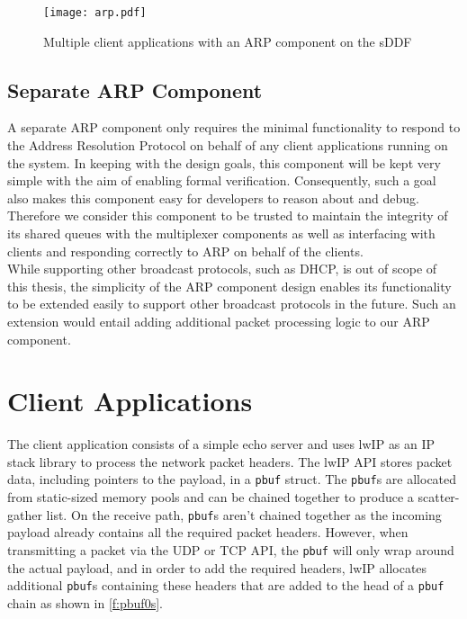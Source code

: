 \begin{figure}[h]
    \centering
    \texttt{[image: arp.pdf]}
    \caption{Multiple client applications with an ARP component on the sDDF}
    \label{f:arp}
\end{figure}

\subsection{Separate ARP Component}\label{s:arp_design}
A separate ARP component only requires the minimal functionality to respond to 
the Address Resolution Protocol on behalf of any client applications running on
the system. In keeping with the design goals, this component will be kept 
very simple with the aim of enabling formal verification. Consequently, such a goal 
also makes this component easy for developers to reason about and debug. Therefore we consider
this component to be trusted to maintain the integrity of its shared queues with
the multiplexer components as well as interfacing with clients and responding
correctly to ARP on behalf of the clients. \\
While supporting other broadcast protocols, such as DHCP, is out of scope of this thesis, 
the simplicity of the ARP component design enables its functionality to be extended easily
to support other broadcast protocols in the future. Such an extension would entail 
adding additional packet processing logic to our ARP component. 

\section{Client Applications}\label{s:client_apps}

The client application consists of a simple echo server and uses lwIP \cite{Dunkels_01} as an IP
stack library to process the network packet headers. The lwIP API stores packet data, including pointers
to the payload, in a \texttt{pbuf} struct. The \texttt{pbuf}s are allocated from static-sized memory pools and can be chained
together to produce a scatter-gather list.
On the receive path, \texttt{pbuf}s aren't chained together as the incoming payload already contains
all the required packet headers. However, when transmitting a packet via the UDP or TCP API, the \texttt{pbuf} will
only wrap around the actual payload, and in order to add the required headers, lwIP allocates additional \texttt{pbuf}s
containing these headers that are added to the head of a \texttt{pbuf} chain as shown in \autoref{f:pbuf0s}. \\

